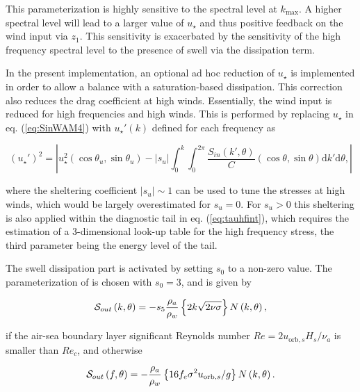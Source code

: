 \noindent
This parameterization is highly sensitive to the spectral level at $k_{\max}$.
A higher spectral level will lead to a larger value of $u_\star$ and thus
positive feedback on the wind input via $z_1$. This sensitivity is exacerbated
by the sensitivity of the high frequency spectral level to the presence of
swell via the dissipation term.

In the present implementation, an optional ad hoc reduction of $u_\star$ is
implemented in order to allow a balance with a saturation-based dissipation.
This correction also reduces the drag coefficient at high winds. Essentially,
the wind input is reduced for high frequencies and high winds. This is
performed by replacing $u_\star$ in eq. (\ref{eq:SinWAM4}) with $u_\star '(k)$
defined for each frequency as

\begin{equation}
\left(u_\star '\right)^2=\left|u_\star^2 \left(\cos \theta_u, \sin
\theta_u \right) - \left|s_u\right| \int_0^k \int_0^{2 \pi}
\frac{S_{in}\left(k',\theta \right)}{C}  \left(\cos \theta, \sin
\theta \right)  {\mathrm d} k' \mathrm d
\theta,\label{ustarp}\right|
\end{equation}

\noindent
where the sheltering coefficient $\left|s_u\right|\sim 1$ can be used to tune
the stresses at high winds, which would be largely overestimated for
$s_u=0$. For $s_u > 0$ this sheltering is also applied within the diagnostic
tail in eq. (\ref{eq:tauhfint}), which requires the estimation of a
3-dimensional look-up table for the high frequency stress, the third parameter
being the energy level of the tail.

The swell dissipation part is activated by setting $s_0$ to a non-zero value.
The parameterization of \cite{art:ACC08} is chosen with $s_0=3$, and is given
by

\begin{equation}
{\cal S}_{out}\left(k,\theta\right) = - s_5 \frac{\rho_a}{\rho_w}\left\{ 2 k \sqrt{2
\nu \sigma}\right\}  N \left(k,\theta\right) \label{Sds_turb},\label{eq:Dore}
\end{equation}

\noindent
if the air-sea boundary layer significant Reynolds number $Re = 2
u_{\mathrm{orb},s} H_s / \nu_{a}$ is smaller than $Re_c$, and otherwise

\begin{equation}
{\cal S}_{out} \left(f,\theta\right) = - \frac{\rho_a}{\rho_w}\left\{  16 f_e
\sigma^2 u_{\mathrm{orb},s} / g \right\}
 N\left(k,\theta\right) \label{Sds_visc}.\label{eq:swell_turb}
\end{equation}

